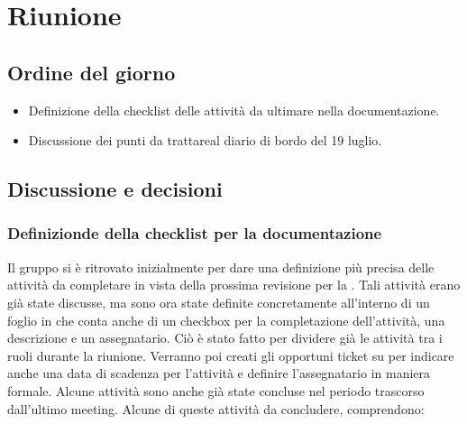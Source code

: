 \section{Riunione}
\subsection{Ordine del giorno}
\begin{itemize}
	\item Definizione della checklist delle attività da ultimare nella documentazione.
	\item Discussione dei punti da trattareal diario di bordo del 19 luglio.
\end{itemize}

\subsection{Discussione e decisioni}
\subsubsection{Definizionde della checklist per la documentazione}
\par Il gruppo si è ritrovato inizialmente per dare una definizione più precisa delle attività da completare in vista della prossima revisione per la \RTB. Tali attività erano già state discusse, ma sono ora state definite concretamente all'interno di un foglio in  che conta anche di un checkbox per la completazione dell'attività, una descrizione e un assegnatario.
Ciò è stato fatto per dividere già le attività tra i ruoli durante la riunione. Verranno poi creati gli opportuni ticket su  per indicare anche una data di scadenza per l'attività e definire l'assegnatario in maniera formale. Alcune attività sono anche già state concluse nel periodo trascorso dall'ultimo meeting.
Alcune di queste attività da concludere, comprendono:

